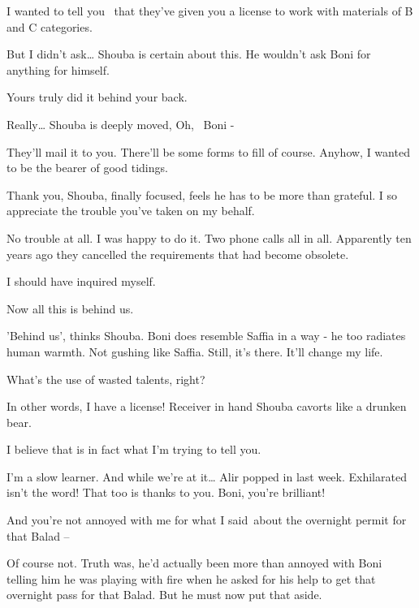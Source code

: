 \documentclass[12pt]{book}
\begin{document}
{\textquotedbl}I wanted to tell you \ that they've given you a license to work with materials of B and C
categories.{\textquotedbl}

{\textquotedbl}But I didn't ask{\dots}{\textquotedbl} Shouba is certain about this. He wouldn't ask Boni for anything
for himself.

{\textquotedbl}Yours truly did it behind your back.{\textquotedbl}

{\textquotedbl}Really{\dots}{\textquotedbl} Shouba is deeply moved, {\textquotedbl}Oh, ~Boni -{\textquotedbl}

{\textquotedbl}They'll mail it to you. There'll be some forms to fill of course. Anyhow, I wanted to be the bearer of
good tidings.{\textquotedbl}

{\textquotedbl}Thank you,{\textquotedbl} Shouba, finally focused, feels he has to be more than grateful.
{\textquotedbl}I so appreciate the trouble you've taken on my behalf.{\textquotedbl}

{\textquotedbl}No trouble at all. I was happy to do it. Two phone calls all in all. Apparently ten years ago they
cancelled the requirements that had become obsolete.{\textquotedbl}

{\textquotedbl}I should have inquired myself.{\textquotedbl}

{\textquotedbl}Now all this is behind us.{\textquotedbl}

{}'Behind us', thinks Shouba. Boni does resemble Saffia in a way - he too radiates human warmth. Not gushing like
Saffia. Still, it's there. {\textquotedbl}It'll change my life.{\textquotedbl}

{\textquotedbl}What's the use of wasted talents, right?{\textquotedbl}

{\textquotedbl}In other words, I have a license!{\textquotedbl} Receiver in hand Shouba cavorts like a drunken bear.

{\textquotedbl}I believe that is in fact what I'm trying to tell you.{\textquotedbl}

{\textquotedbl}I'm a slow learner. And while we're at it{\dots} Alir popped in last week. Exhilarated isn't the word!
That too is thanks to you. Boni, you're brilliant!{\textquotedbl}

{\textquotedbl}And you're not annoyed with me for what I said~about the overnight permit for that Balad
--{\textquotedbl}

{\textquotedbl}Of course not.{\textquotedbl} Truth{ }was, he'd actually been more than annoyed with Boni
telling him he was playing with fire when he asked for his help to get that overnight pass for that{
}Balad. But he must now put that aside.
\end{document}
